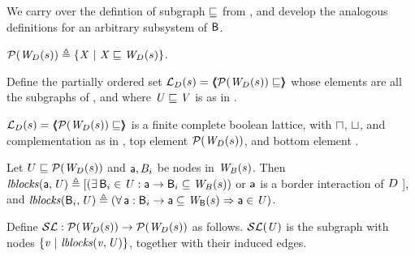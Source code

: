 We carry over the defintion of subgraph $\subg$ from , and develop the analogous definitions for an arbitrary subsystem
of $\B$.


\begin{definition} \label{defn:wsetOfSubgraphsLoc}
$\lwfgS{B}{s}{\DS} \df  \set{ \XS \stt \XS \subg \lwfg{B}{s}{\DS} }$.
\end{definition}

\begin{definition} \label{defn:wflatticeLoc}
Define the partially ordered set 
$\llat{\B}{s}{\DS}  = \tpl{ \lwfgS{B}{s}{\DS}  \subg }$ 
whose elements are all the subgraphs of 
, and where  $\US \subg \VS$ is as in .   
\end{definition}

\begin{proposition} \label{prop:isALatticeLoc}
$\llat{\B}{s}{\DS}  = \tpl{ \lwfgS{B}{s}{\DS}  \subg }$
 is a finite complete boolean lattice, with $\meet$, $\join$, and complementation as in 
, top element $\lwfgS{B}{s}{\DS}$, and bottom element \ewfg.
\end{proposition}

\begin{definition} \label{defn:blocksLoc}
Let $U \subg \lwfgS{B}{s}{\DS}$ and $\act, B_i$ be nodes in $\wfg{B}{s}$. Then 
$\lblocks{\act}{\US} \df [ (\ex \B_i \in \US : \act \ar \B_i \sub \wfg{B}{s})$ or $\act$ is a border interaction of $\DS$ ], and 
$\lblocks{\B_i}{\US} \df (\fa \act : \B_i \ar \act \sub\wfg{\B}{s} \imp \act \in \US)$.
\end{definition}


\begin{definition}[$\lSFs$] \label{defn:scFixLoc}
Define $\lSFs:  \lwfgS{B}{s}{\DS}  \to  \lwfgS{B}{s}{\DS}$ as follows.
$\lSF{\US}$ is the subgraph with nodes $\set{\ndv \stt \lblocks{\ndv}{\US} }$, together with their induced edges.
\end{definition}

